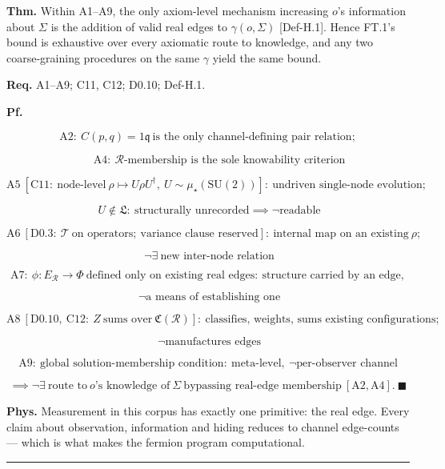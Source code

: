 \begin{theorem}\label{tag:FT-2}
\textbf{Thm.} Within A1–A9, the only axiom-level mechanism increasing $o$'s information about $\Sigma$ is the addition of valid real edges to $\gamma(o,\Sigma)$ [Def-H.1]. Hence FT.1's bound is exhaustive over every axiomatic route to knowledge, and any two coarse-graining procedures on the same $\gamma$ yield the same bound.

\textbf{Req.} A1–A9; C11, C12; D0.10; Def-H.1.

\textbf{Pf.}

\[
\mathrm{A2}:\ C(p,q)=1\mathfrak q\ \text{is the only channel-defining pair relation};
\]

\[
\qquad \mathrm{A4}:\ \mathcal R\text{-membership is the sole knowability criterion}
\]

\[
\mathrm{A5}\ [\mathrm{C11}:\ \text{node-level}\ \rho\mapsto U\rho U^\dagger,\ U\sim\mu_\star(\mathrm{SU}(2))]:\ \text{undriven single-node evolution};
\]

\[
\ U\notin\mathfrak L:\ \text{structurally unrecorded}\implies\neg\text{readable}
\]

\[
\mathrm{A6}\ [\mathrm{D0.3}:\ \mathcal T\ \text{on operators};\ \text{variance clause reserved}]:\ \text{internal map on an existing}\ \rho;
\]

\[
\ \neg\exists\ \text{new inter-node relation}
\]

\[
\mathrm{A7}:\ \phi:E_{\mathcal R}\to\Phi\ \text{defined only on existing real edges}:\ \text{structure carried by an edge},
\]

\[
\ \neg\text{a means of establishing one}
\]

\[
\mathrm{A8}\ [\mathrm{D0.10},\ \mathrm{C12}:\ Z\ \text{sums over}\ \mathfrak C(\mathcal R)]:\ \text{classifies, weights, sums existing configurations};
\]

\[
\ \neg\text{manufactures edges}
\]

\[
\mathrm{A9}:\ \text{global solution-membership condition}:\ \text{meta-level},\ \neg\text{per-observer channel}
\]

\[
\implies\neg\exists\ \text{route to}\ o\text{'s knowledge of}\ \Sigma\ \text{bypassing real-edge membership}\ [\mathrm{A2},\mathrm{A4}].\ \blacksquare
\]

\textbf{Phys.} Measurement in this corpus has exactly one primitive: the real edge. Every claim about observation, information and hiding reduces to channel edge-counts — which is what makes the fermion program computational.

\vspace{2pt}\noindent\rule{\textwidth}{0.4pt}\vspace{2pt}

\end{theorem}

